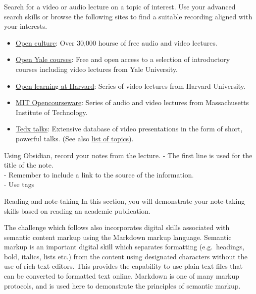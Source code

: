 \documentclass[
]{book}
\providecommand{\tightlist}{%
  \setlength{\itemsep}{0pt}\setlength{\parskip}{0pt}}
\theoremstyle{definition}
\theoremstyle{definition}
\theoremstyle{definition}
\theoremstyle{definition}
\theoremstyle{remark}
\begin{document}
\begin{reflect}
Search for a video or audio lecture on a topic of interest. Use your advanced search skills or browse the following sites to find a suitable recording aligned with your interests.

\begin{itemize}
\tightlist
\item
  \href{https://www.openculture.com/freeonlinecourses}{Open culture}: Over 30,000 hourse of free audio and video lectures.
\item
  \href{https://oyc.yale.edu/}{Open Yale courses}: Free and open access to a selection of introductory courses including video lectures from Yale University.
\item
  \href{https://extension.harvard.edu/online-learning/}{Open learning at Harvard}: Series of video lectures from Harvard University.
\item
  \href{https://ocw.mit.edu/search/?f=Lecture\%20Videos\&f=Lecture\%20Audio\&s=department_course_numbers.sort_coursenum}{MIT Opencourseware}: Series of audio and video lectures from Massachusetts Institute of Technology.
\item
  \href{https://www.ted.com/}{Tedx talks}: Extensive database of video presentations in the form of short, powerful talks. (See also \href{https://www.ted.com/topics}{list of topics}).
\end{itemize}

Using Obsidian, record your notes from the lecture.
- The first line is used for the title of the note.\\
- Remember to include a link to the source of the information.\\
- Use tags
\end{reflect}

Reading and note-taking
In this section, you will demonstrate your note-taking skills based on reading an academic publication.

The challenge which follows also incorporates digital skills associated with semantic content markup using the Markdown markup language. Semantic markup is an important digital skill which separates formatting (e.g.~headings, bold, italics, lists etc.) from the content using designated characters without the use of rich text editors. This provides the capability to use plain text files that can be converted to formatted text online. Markdown is one of many markup protocols, and is used here to demonstrate the principles of semantic markup.
\end{document}
